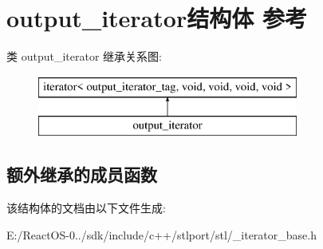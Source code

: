 \hypertarget{structoutput__iterator}{}\section{output\+\_\+iterator结构体 参考}
\label{structoutput__iterator}
类 output\+\_\+iterator 继承关系图\+:\begin{figure}[H]
\begin{center}
\leavevmode
\includegraphics[height=2.000000cm]{structoutput__iterator}
\end{center}
\end{figure}
\subsection*{额外继承的成员函数}


该结构体的文档由以下文件生成\+:\begin{DoxyCompactItemize}
\item 
E\+:/\+React\+O\+S-\/0../sdk/include/c++/stlport/stl/\+\_\+iterator\+\_\+base.\+h\end{DoxyCompactItemize}

